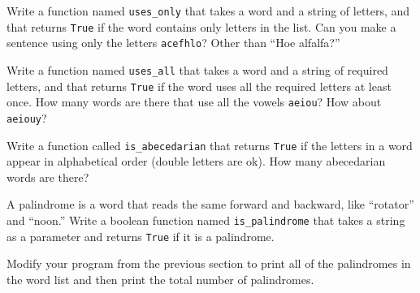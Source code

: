 \begin{exercise}
\label{ex:uses-only}

Write a function named \verb"uses_only" that takes a word and a
string of letters, and that returns {\tt True} if the word contains
only letters in the list.  Can you make a sentence using only the
letters {\tt acefhlo}?  Other than ``Hoe alfalfa?''
\end{exercise}


\begin{exercise} 
\label{ex:uses-all}

Write a function named \verb"uses_all" that takes a word and a
string of required letters, and that returns {\tt True} if the word
uses all the required letters at least once.  How many words are there
that use all the vowels {\tt aeiou}?  How about {\tt aeiouy}?
\end{exercise}


\begin{exercise}
\label{ex:abecedarian}

Write a function called \verb"is_abecedarian" that returns
{\tt True} if the letters in a word appear in alphabetical order
(double letters are ok).  
How many abecedarian words are there?
\end{exercise}



\begin{exercise}
\label{ex:palindrome}
A palindrome is a word that reads the same
forward and backward, like ``rotator'' and ``noon.''
Write a boolean function named \verb"is_palindrome" that
takes a string as a parameter and returns {\tt True} if it is
a palindrome.

Modify your program from the previous section to print all
of the palindromes in the word list and then print the total
number of palindromes.
\end{exercise}

